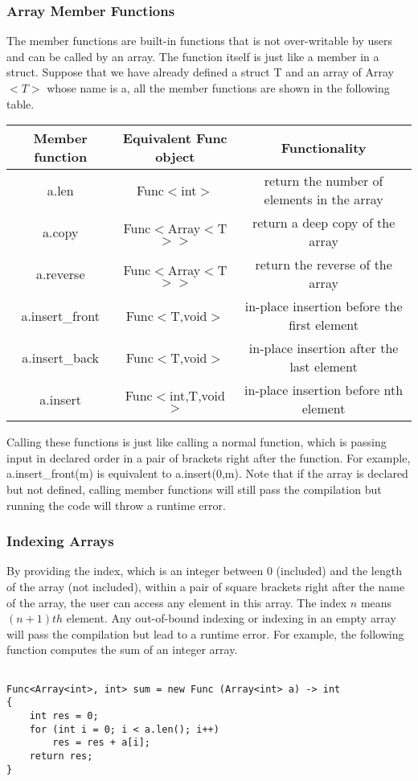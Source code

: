 \subsubsection{Array Member Functions}
The member functions are built-in functions that is not over-writable by users and can be called by an array. The function itself is just like a member in a struct. Suppose that we have already defined a struct T and an array of Array$<T>$ whose name is a, all the member functions are shown in the following table.
\begin{table}[h]
\centering
\begin{tabular}{|c|c|c|}
\hline
Member function & Equivalent Func object & Functionality                               \\ \hline
a.len           & Func$<$int$>$          & return the number of elements in the array  \\ \hline
a.copy          & Func$<$Array$<$T$>$$>$ & return a deep copy of the array             \\ \hline
a.reverse       & Func$<$Array$<$T$>$$>$ & return the reverse of the array             \\ \hline
a.insert\_front & Func$<$T,void$>$       & in-place insertion before the first element \\ \hline
a.insert\_back  & Func$<$T,void$>$       & in-place insertion after the last element   \\ \hline
a.insert        & Func$<$int,T,void$>$   & in-place insertion before nth element       \\ \hline
\end{tabular}
\end{table}
\par Calling these functions is just like calling a normal function, which is passing input in declared order in a pair of brackets right after the function. For example, a.insert\_front(m) is equivalent to a.insert(0,m). Note that if the array is declared but not defined, calling member functions will still pass the compilation but running the code will throw a runtime error.

\subsubsection{Indexing Arrays}
\par By providing the index, which is an integer between 0 (included) and the length of the array (not included), within a pair of square brackets right after the name of the array, the user can access any element in this array. The index $n$ means $(n+1)th$ element. Any out-of-bound indexing or indexing in an empty array will pass the compilation but lead to a runtime error. For example, the following function computes the sum of an integer array.
\begin{lstlisting}[caption={array\_sum.csm}, captionpos=b]

Func<Array<int>, int> sum = new Func (Array<int> a) -> int 
{
    int res = 0;
    for (int i = 0; i < a.len(); i++)
        res = res + a[i];
    return res;
}

\end{lstlisting}